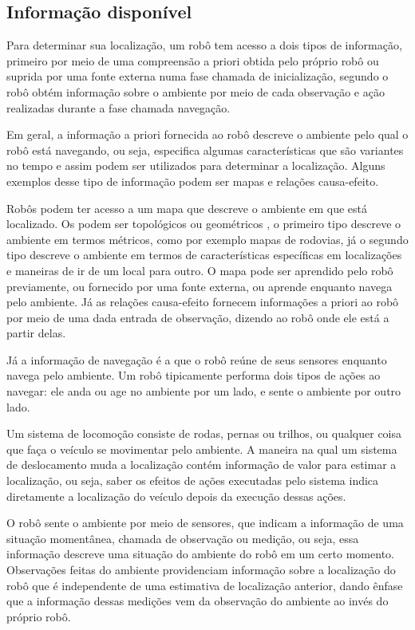 \documentclass[acronym, symbols, table]{fei}
\begin{document}
		\subsection{Informação disponível}
			
			Para determinar sua localização, um robô tem acesso a dois tipos de informação, primeiro por meio de uma compreensão a priori obtida pelo próprio robô ou suprida por uma fonte externa numa fase chamada de inicialização, segundo o robô obtém informação sobre o ambiente por meio de cada observação e ação realizadas durante a fase chamada navegação. 
			
			Em geral, a informação a priori fornecida ao robô descreve o ambiente pelo qual o robô está navegando, ou seja, especifica algumas características que são variantes no tempo e assim podem ser utilizados para determinar a localização. Alguns exemplos desse tipo de informação podem ser mapas e relações causa-efeito.
			
			Robôs podem ter acesso a um mapa que descreve o ambiente em que está localizado. Os podem ser topológicos ou geométricos \cite{singhal1997issues}, o primeiro tipo descreve o ambiente em termos métricos, como por exemplo mapas de rodovias, já o segundo tipo descreve o ambiente em termos de características específicas em localizações e maneiras de ir de um local para outro. O mapa pode ser aprendido pelo robô previamente, ou fornecido por uma fonte externa, ou aprende enquanto navega pelo ambiente. Já as relações causa-efeito fornecem informações a priori ao robô por meio de uma dada entrada de observação, dizendo ao robô onde ele está a partir delas. 
			
			Já a informação de navegação é a que o robô reúne de seus sensores enquanto navega pelo ambiente. Um robô tipicamente performa dois tipos de ações ao navegar: ele anda ou age no ambiente por um lado, e sente o ambiente por outro lado.
			
			Um sistema de locomoção consiste de rodas, pernas ou trilhos, ou qualquer coisa que faça o veículo se movimentar pelo ambiente. A maneira na qual um sistema de deslocamento muda a localização contém informação de valor para estimar a localização, ou seja, saber os efeitos de ações executadas pelo sistema indica diretamente a localização do veículo depois da execução dessas ações.
			
			O robô sente o ambiente por meio de sensores, que indicam a informação de uma situação momentânea, chamada de observação ou medição, ou seja, essa informação descreve uma situação do ambiente do robô em um certo momento. Observações feitas do ambiente providenciam informação sobre a localização do robô que é independente de uma estimativa de localização anterior, dando ênfase que a informação dessas medições vem da observação do ambiente ao invés do próprio robô.
	
\end{document}
